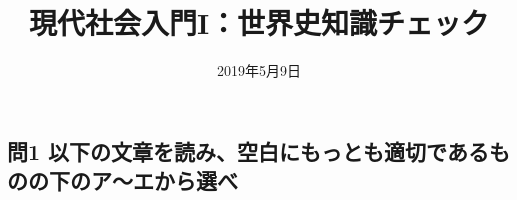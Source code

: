 \documentclass[dvipdfmx,uplatex]{bxjsarticle}
\date{2019年5月9日}
\title{\vspace{-4cm}現代社会入門I：世界史知識チェック}
\begin{document}
\maketitle

%







\subsection*{問1 以下の文章を読み、空白にもっとも適切であるものの下のア〜エから選べ}
\end{document}
